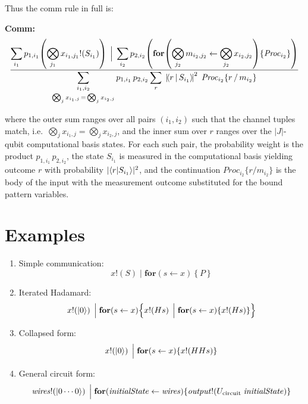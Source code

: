 \documentclass[11pt]{article}
\newcommand{\Proc}{\mathit{Proc}}
\begin{document}
\bigskip

Thus the comm rule in full is:

\bigskip

\noindent\textbf{Comm:}
\[
  \frac{\displaystyle
    \sum_{i_1} p_{1,i_1}
      \!\left(\bigotimes_{j_1} x_{i_1,j_1}!\!\left(S_{i_1}\right)\right)
    \;\Big|\;
    \sum_{i_2} p_{2,i_2}
      \!\left(
        \mathbf{for}\!\left(
          \bigotimes_{j_2} m_{i_2,j_2}
          \leftarrow
          \bigotimes_{j_2} x_{i_2,j_2}
        \right)\!\left\{\Proc_{i_2}\right\}
      \right)
  }{\displaystyle
    \sum_{\substack{i_1, i_2 \\[2pt]
      \bigotimes_j x_{i_1,j} \,=\, \bigotimes_j x_{i_2,j}}}
    p_{1,i_1}\, p_{2,i_2}
    \sum_{r}\;
    \left|\!\braket{r \,|\, S_{i_1}}\!\right|^{2}\;
    \Proc_{i_2}\!\left\{r \,/\, m_{i_2}\right\}
  }
\]

\noindent
where the outer sum ranges over all pairs $(i_1, i_2)$ such that the
channel tuples match, i.e.\
$\bigotimes_j x_{i_1, j} = \bigotimes_j x_{i_2, j}$, and the inner
sum over $r$ ranges over the $|J|$-qubit computational basis states.
For each such pair, the probability weight is the product
$p_{1,i_1}\, p_{2,i_2}$, the state $S_{i_1}$ is measured in the
computational basis yielding outcome $r$ with probability
$|\!\braket{r | S_{i_1}}\!|^2$, and the continuation
$\Proc_{i_2}\{r/m_{i_2}\}$ is the body of the input with the
measurement outcome substituted for the bound pattern variables.

\section{Examples}

\begin{enumerate}[label=\arabic*.]
  \item Simple communication:
  \[
    x!\!\left(S\right)
    \;\Big|\;
    \mathbf{for}\!\left(s \leftarrow x\right)\!\left\{P\right\}
  \]

  \item Iterated Hadamard:
  \[
    x!\!\left(\ket{0}\right)
    \;\Big|\;
    \mathbf{for}\!\left(s \leftarrow x\right)\!\left\{
      x!\!\left(Hs\right)
      \;\Big|\;
      \mathbf{for}\!\left(s \leftarrow x\right)\!\left\{
        x!\!\left(Hs\right)
      \right\}
    \right\}
  \]

  \item Collapsed form:
  \[
    x!\!\left(\ket{0}\right)
    \;\Big|\;
    \mathbf{for}\!\left(s \leftarrow x\right)\!\left\{
      x!\!\left(HHs\right)
    \right\}
  \]

  \item General circuit form:
  \[
    \mathit{wires}!\!\left(\ket{0\cdots 0}\right)
    \;\Big|\;
    \mathbf{for}\!\left(\mathit{initialState}
      \leftarrow \mathit{wires}\right)\!\left\{
      \mathit{output}!\!\left(U_{\mathrm{circuit}}\;\mathit{initialState}\right)
    \right\}
  \]
\end{enumerate}
\end{document}
